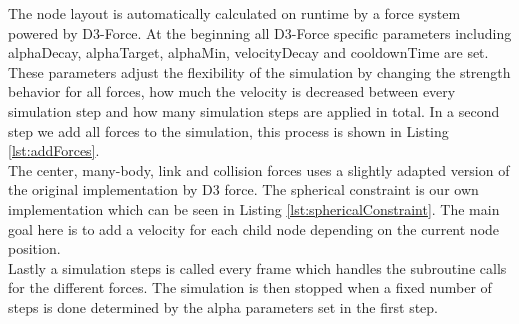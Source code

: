 The node layout is automatically calculated on runtime by a force system powered by D3-Force. At the beginning all D3-Force specific parameters including alphaDecay, alphaTarget, alphaMin, velocityDecay and cooldownTime are set. 
These parameters adjust the flexibility of the simulation by changing the strength behavior for all forces, how much the velocity is decreased between every simulation step and how many simulation steps are applied in total.
In a second step we add all forces to the simulation, this process is shown in Listing \ref{lst:addForces}.\\
The center, many-body, link and collision forces uses a slightly adapted version of the original implementation by D3 force. 
The spherical constraint is our own implementation which can be seen in Listing \ref{lst:sphericalConstraint}. The main goal here is to add a velocity for each child node depending on the current node position.\\
Lastly a simulation steps is called every frame which handles the subroutine calls for the different forces. The simulation is then stopped when a fixed number of steps is done determined by the alpha parameters set in the first step.

